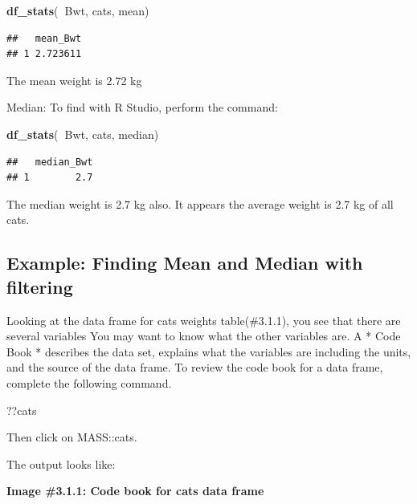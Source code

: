 \documentclass[
]{book}
\newenvironment{Shaded}{\begin{snugshade}}{\end{snugshade}}
\newcommand{\KeywordTok}[1]{\textcolor[rgb]{0.13,0.29,0.53}{\textbf{#1}}}
\newcommand{\NormalTok}[1]{#1}
\newcommand{\OperatorTok}[1]{\textcolor[rgb]{0.81,0.36,0.00}{\textbf{#1}}}
\begin{document}
\begin{Shaded}
\begin{Highlighting}[]
\KeywordTok{df_stats}\NormalTok{(}\OperatorTok{~}\NormalTok{Bwt, cats, mean)}
\end{Highlighting}
\end{Shaded}

\begin{verbatim}
##   mean_Bwt
## 1 2.723611
\end{verbatim}

The mean weight is 2.72 kg

Median:
To find with R Studio, perform the command:

\begin{Shaded}
\begin{Highlighting}[]
\KeywordTok{df_stats}\NormalTok{(}\OperatorTok{~}\NormalTok{Bwt, cats, median)}
\end{Highlighting}
\end{Shaded}

\begin{verbatim}
##   median_Bwt
## 1        2.7
\end{verbatim}

The median weight is 2.7 kg also. It appears the average weight is 2.7 kg of all cats.

\hypertarget{example-finding-mean-and-median-with-filtering}{%
\subsection{Example: Finding Mean and Median with filtering}\label{example-finding-mean-and-median-with-filtering}}

Looking at the data frame for cats weights table(\#3.1.1), you see that there are several variables You may want to know what the other variables are. A * Code Book * describes the data set, explains what the variables are including the units, and the source of the data frame. To review the code book for a data frame, complete the following command.

\begin{Shaded}
\begin{Highlighting}[]
\NormalTok{??cats}
\end{Highlighting}
\end{Shaded}

Then click on MASS::cats.

The output looks like:

\textbf{Image \#3.1.1: Code book for cats data frame}
\end{document}
